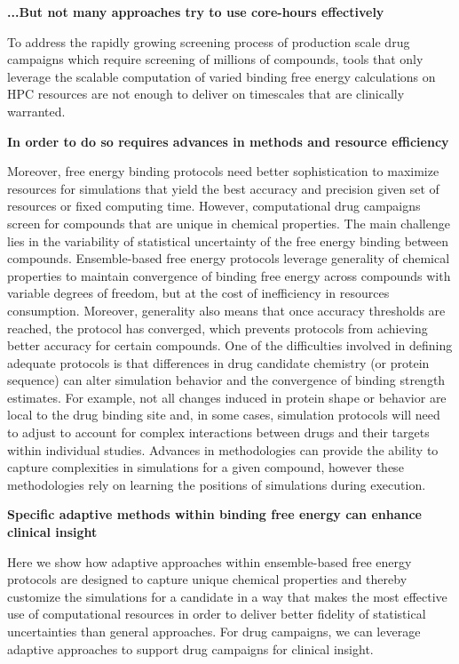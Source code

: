 \textbf{...But not many approaches try to use core-hours effectively}

To address the rapidly growing screening process of production scale drug 
campaigns which require screening of millions of compounds, tools that only 
leverage the scalable computation of varied binding free energy calculations on 
HPC resources are not enough to deliver on timescales that are clinically 
warranted. 

\textbf{In order to do so requires advances in methods and resource efficiency}

Moreover, free energy binding protocols need better sophistication to 
maximize resources for simulations that yield the best accuracy and precision 
given set of resources or fixed computing time. However, computational drug 
campaigns screen for compounds that are unique in chemical properties. The main 
challenge lies in the variability of statistical uncertainty of the free energy 
binding between compounds. Ensemble-based free energy protocols leverage 
generality of chemical properties to maintain convergence of binding free energy 
across compounds with variable degrees of freedom, but at the cost of 
inefficiency in resources consumption. Moreover, generality also means that 
once accuracy thresholds are reached, the protocol has converged, which prevents
protocols from achieving better accuracy for certain compounds.  One of the 
difficulties involved in defining adequate protocols is that differences in 
drug candidate chemistry (or protein sequence) can alter simulation behavior and 
the convergence of binding strength estimates. For example, not all changes 
induced in protein shape or behavior are local to the drug binding site and, in 
some cases, simulation protocols will need to adjust to account for complex 
interactions between drugs and their targets within individual studies. Advances 
in methodologies can provide the ability to capture complexities in simulations 
for a given compound, however these methodologies rely on learning the positions 
of simulations during execution. 
 

\textbf{Specific adaptive methods within binding free energy can enhance 
clinical insight}

Here we show how adaptive approaches within ensemble-based free energy 
protocols are designed to capture unique chemical properties and thereby 
customize the simulations for a candidate in a way that makes the most 
effective use of computational resources in order to deliver better fidelity of 
statistical uncertainties than general approaches. For drug campaigns, we can 
leverage adaptive approaches to support drug campaigns for clinical insight. 

